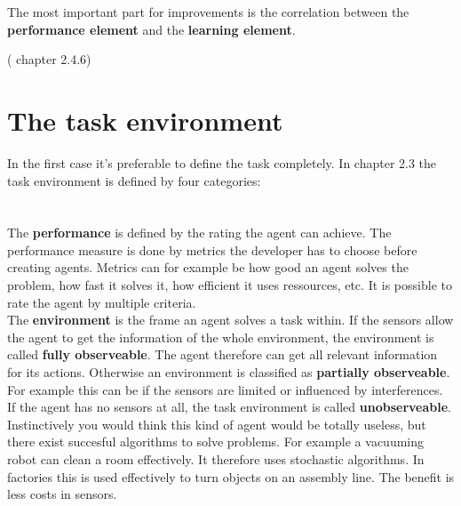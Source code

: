 \documentclass[10pt,a4paper,DIV=11]{scrreprt}
\begin{document}
The most important part for improvements is the correlation between the \textbf{performance element} and the \textbf{learning element}.

(\cite{ai} chapter 2.4.6)

\section{The task environment}
\label{sec:env}
In the first case it's preferable to define the task completely. In \cite{ai} chapter 2.3 the task environment is defined by four categories: \\

   \\
\\

The \textbf{performance} is defined by the rating the agent can achieve. The performance measure is done by metrics the developer has to choose before creating agents. Metrics can for example be how good an agent solves the problem, how fast it solves it, how efficient it uses ressources, etc. It is possible to rate the agent by multiple criteria. \\

The \textbf{environment} is the frame an agent solves a task within.
If the sensors allow the agent to get the information of the whole environment, the environment is called \textbf{fully observeable}. The agent therefore can get all relevant information for its actions. Otherwise an environment is classified as \textbf{partially observeable}. For example this can be if the sensors are limited or influenced by interferences.
If the agent has no sensors at all, the task environment is called \textbf{unobserveable}. Instinctively you would think this kind of agent would be totally useless, but there exist succesful algorithms to solve problems. For example a vacuuming robot can clean a room effectively. It therefore uses stochastic algorithms. In factories this is used effectively to turn objects on an assembly line. The benefit is less costs in sensors. \\
\end{document}
